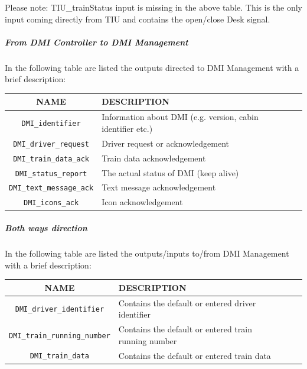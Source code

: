       Please note: TIU\_trainStatus input is missing in the above table. This is the only input coming directly from TIU and contains the open/close Desk signal. 
    
  \subparagraph{From DMI Controller to DMI Management }
  In the following table are listed the outputs directed to DMI Management with a brief description:\\
    \begin{tabular}{| c | l | l | l | l |}
      \hline
      \textbf{NAME} & \textbf{DESCRIPTION} \\ \hline
      \texttt{DMI\_identifier} & Information about DMI (e.g. version, cabin identifier etc.)\\
      \texttt{DMI\_driver\_request} & Driver request or acknowledgement\\
      \texttt{DMI\_train\_data\_ack} & Train data acknowledgement\\
      \texttt{DMI\_status\_report} & The actual status of DMI (keep alive)\\
      \texttt{DMI\_text\_message\_ack} & Text message acknowledgement\\
      \texttt{DMI\_icons\_ack} & Icon acknowledgement\\

      \hline
    \end{tabular} 
    \label{tbl:DMICtrToDMIMng}
    
\subparagraph{Both ways direction }
In the following table are listed the outputs/inputs  to/from DMI Management with a brief description:\\
  
    \begin{tabular}{| c | l | l | l | l |}
      \hline
      \textbf{NAME} & \textbf{DESCRIPTION} \\ \hline
      \texttt{DMI\_driver\_identifier} & Contains the default or entered driver identifier\\
      \texttt{DMI\_train\_running\_number} & Contains the default or entered train running number\\
      \texttt{DMI\_train\_data} & Contains the default or entered train data\\
      \hline
    \end{tabular} 
    \label{tbl:DMICtrToDMIMng}
  

